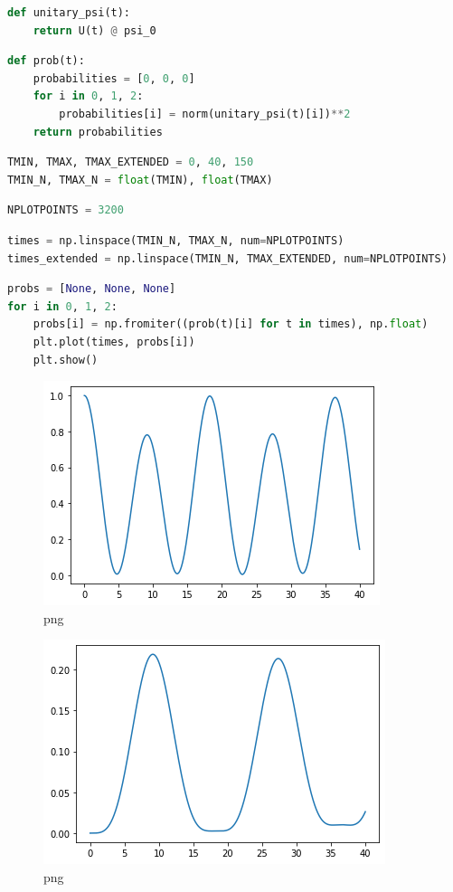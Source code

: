 \begin{lstlisting}[language=Python]
def unitary_psi(t):
    return U(t) @ psi_0
\end{lstlisting}

\begin{lstlisting}[language=Python]
def prob(t):
    probabilities = [0, 0, 0]
    for i in 0, 1, 2:
        probabilities[i] = norm(unitary_psi(t)[i])**2
    return probabilities
\end{lstlisting}

\begin{lstlisting}[language=Python]
TMIN, TMAX, TMAX_EXTENDED = 0, 40, 150
TMIN_N, TMAX_N = float(TMIN), float(TMAX)
\end{lstlisting}

\begin{lstlisting}[language=Python]
NPLOTPOINTS = 3200
\end{lstlisting}

\begin{lstlisting}[language=Python]
times = np.linspace(TMIN_N, TMAX_N, num=NPLOTPOINTS)
times_extended = np.linspace(TMIN_N, TMAX_EXTENDED, num=NPLOTPOINTS)
\end{lstlisting}

\begin{lstlisting}[language=Python]
probs = [None, None, None]
for i in 0, 1, 2:
    probs[i] = np.fromiter((prob(t)[i] for t in times), np.float)
    plt.plot(times, probs[i])
    plt.show()
\end{lstlisting}

\begin{figure}
\centering
\includegraphics[width=0.666\linewidth]{tex/appendix/nb/jupyter/3lev/output_13_0.png}
\caption{png}
\end{figure}

\begin{figure}
\centering
\includegraphics[width=0.666\linewidth]{tex/appendix/nb/jupyter/3lev/output_13_1.png}
\caption{png}
\end{figure}

